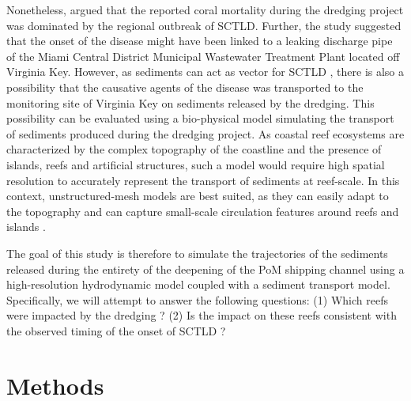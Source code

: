 \documentclass[preprint,12pt,authoryear]{elsarticle}
\begin{document}
Nonetheless, \cite{gintert2019regional} argued that the reported coral mortality during the dredging project was dominated by the regional outbreak of SCTLD. Further, the study suggested that the onset of the disease might have been linked to a leaking discharge pipe of the Miami Central District Municipal Wastewater Treatment Plant located off Virginia Key. However, as sediments can act as vector for SCTLD \citep{studivan2022reef}, there is also a possibility that the causative agents of the disease was transported to the monitoring site of Virginia Key on sediments released by the dredging. This possibility can be evaluated using a bio-physical model simulating the transport of sediments produced during the dredging project. As coastal reef ecosystems are characterized by the complex topography of the coastline and the presence of islands, reefs and artificial structures, such a model would require high spatial resolution to accurately represent the transport of sediments at reef-scale. In this context, unstructured-mesh models are best suited, as they can easily adapt to the topography \citep{fringer2019future} and can capture small-scale circulation features around reefs and islands \citep{lambrechts2008multi, figueiredo2013synthesizing}.

The goal of this study is therefore to simulate the trajectories of the sediments released during the entirety of the deepening of the PoM shipping channel using a high-resolution hydrodynamic model coupled with a sediment transport model. Specifically, we will attempt to answer the following questions: (1) Which reefs were impacted by the dredging ? (2) Is the impact on these reefs consistent with the observed timing of the onset of SCTLD ? 

\section{Methods}
\end{document}
